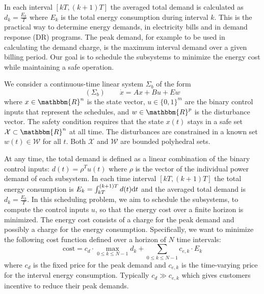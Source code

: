 In each interval $[kT, (k + 1) T]$ the averaged total demand is calculated as $d_k = \frac{E_k}{T}$ where $E_k$ is the total energy consumption during interval $k$.
This is the practical way to determine energy demands, \eg in electricity bills and in demand response (DR) programs.
The peak demand, for example to be used in calculating the demand charge, is the maximum interval demand over a given billing period. %
Our goal is to schedule the subsystems to minimize the energy cost %
while maintaining a safe operation.

We consider a continuous-time linear system $\Sigma_b$ of the form
%
\begin{equation*}
(\Sigma_b) \qquad \dot{x} = Ax + Bu + Ew
\end{equation*}
%
where $x \in \mathbbm{R}^{n}$ is the state vector, $u \in \{ 0, 1 \}^{m}$ are the binary control inputs that represent the schedules, and $w \in \mathbbm{R}^{p}$ is the disturbance vector.
The safety condition requires that the state $x (t)$ stays in a safe set $\mathcal{X} \subset \mathbbm{R}^n$ at all time.
The disturbances are constrained in a known set $w (t) \in \mathcal{W}$ for all $t$.
Both $\mathcal{X}$ and $\mathcal{W}$ are bounded polyhedral sets.

At any time, the total demand is defined as a linear combination of the binary
control inputs: $d (t) = \rho^T u (t)$ where $\rho$ is the vector of the individual
power demand of each subsystem. In each time interval $[kT, (k + 1) T]$ the
total energy consumption is $E_k = \int_{kT}^{(k + 1) T} d (t) \mathrm{d} t$ and
the averaged total demand is $d_k = \frac{E_k}{T}$. 
In this scheduling problem, we aim to schedule
the subsystems, \ie to compute the control inputs $u$, so that the energy cost over a finite horizon is minimized.
The energy cost consists of a charge for the peak demand and possibly a charge for the energy
consumption.
Specifically, we want to minimize the following cost function defined over a horizon of $N$ time intervals:
\begin{equation}
  \label{eq:cost-function} \text{cost} = c_d \cdot \max_{0 \leqslant k
  \leqslant N - 1} d_k + \textstyle\sum_{0 \leqslant k \leqslant N - 1} c_{e, k} \cdot
  E_k
\end{equation}
where $c_d$ is the fixed price for the peak demand and $c_{e, k}$ is the
time-varying price for the interval energy consumption.
Typically $c_d \gg c_{e, k}$ which gives customers incentive to reduce their peak demands.

